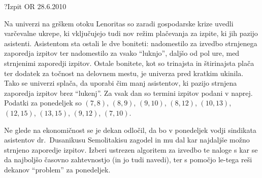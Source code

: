 \begin{naloga}{?}{Izpit OR 28.6.2010}
\begin{vprasanje}
Na univerzi na grškem otoku Lenoritas
so zaradi gospodarske krize uvedli varčevalne ukrepe,
ki vključujejo tudi nov režim plačevanja za izpite,
ki jih pazijo asistenti.
Asistentom sta ostali le dve boniteti:
nadomestilo za izvedbo strnjenega zaporedja izpitov
ter nadomestilo za vsako ``luknjo'', daljšo od pol ure,
med strnjenimi zaporedji izpitov.
Ostale bonitete,
kot so trinajsta in štirinajsta plača
ter dodatek za točnost na delovnem mestu,
je univerza pred kratkim ukinila.
Tako se univerzi splača, da uporabi čim manj asistentov,
ki pazijo strnjena zaporedja izpitov brez ``lukenj''.
Za vsak dan so termini izpitov podani v naprej.
Podatki za ponedeljek so $(7, 8)$, $(8, 9)$, $(9, 10)$, $(8, 12)$,
$(10, 13)$, $(12, 15)$, $(13, 15)$, $(9, 12)$, $(7, 10)$.

Ne glede na ekonomičnost se je dekan odločil,
da bo v ponedeljek vodji sindikata asistentov dr.~Dusanikusu Semolitakisu
zagodel in mu dal kar najdaljše možno strnjeno zaporedje izpitov.
Izberi ustrezen algoritem za izvedbo te naloge
s kar se da najboljšo časovno zahtevnostjo (in jo tudi navedi),
ter s pomočjo le-tega reši dekanov ``problem'' za ponedeljek.

\end{vprasanje}
\begin{odgovor}
\end{odgovor}
\end{naloga}
